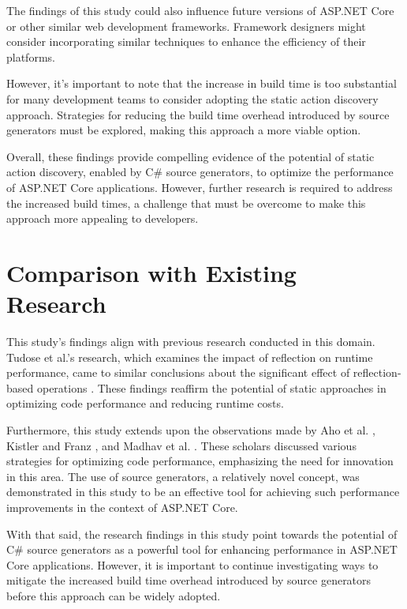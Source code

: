 The findings of this study could also influence future versions of ASP.NET Core or other similar web development frameworks. Framework designers might consider incorporating similar techniques to enhance the efficiency of their platforms.

However, it's important to note that the increase in build time is too substantial for many development teams to consider adopting the static action discovery approach. Strategies for reducing the build time overhead introduced by source generators must be explored, making this approach a more viable option.

Overall, these findings provide compelling evidence of the potential of static action discovery, enabled by C\# source generators, to optimize the performance of ASP.NET Core applications. However, further research is required to address the increased build times, a challenge that must be overcome to make this approach more appealing to developers.


\section{Comparison with Existing Research}

This study's findings align with previous research conducted in this domain. Tudose et al.'s research, which examines the impact of reflection on runtime performance, came to similar conclusions about the significant effect of reflection-based operations \cite{Tudose2013}. These findings reaffirm the potential of static approaches in optimizing code performance and reducing runtime costs.

Furthermore, this study extends upon the observations made by Aho et al. \cite{Aho2007}, Kistler and Franz \cite{Kistler2003}, and Madhav et al. 
\cite{Shreyas2021}. These scholars discussed various strategies for optimizing code performance, emphasizing the need for innovation in this area. The use of source generators, a relatively novel concept, was demonstrated in this study to be an effective tool for achieving such performance improvements in the context of ASP.NET Core.

With that said, the research findings in this study point towards the potential of C\# source generators as a powerful tool for enhancing performance in ASP.NET Core applications. However, it is important to continue investigating ways to mitigate the increased build time overhead introduced by source generators before this approach can be widely adopted.


